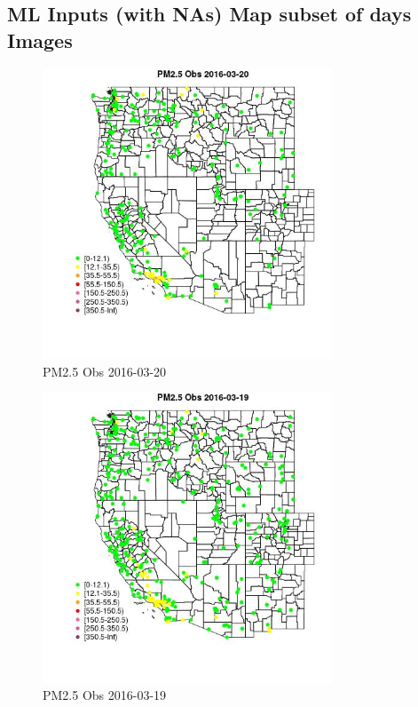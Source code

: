 
\subsection{ML Inputs (with NAs) Map subset of days Images} 
 

\begin{figure} 
\centering  
\includegraphics[width=0.77\textwidth]{Code_Outputs/Report_ML_input_PM25_Step4_part_e_de_duplicated_aveswNAs_MapObsPM25_Obs2016-03-20.jpg} 
\caption{\label{fig:Report_ML_input_PM25_Step4_part_e_de_duplicated_aveswNAsMapObsPM25_Obs2016-03-20}PM2.5 Obs 2016-03-20} 
\end{figure} 
 

\begin{figure} 
\centering  
\includegraphics[width=0.77\textwidth]{Code_Outputs/Report_ML_input_PM25_Step4_part_e_de_duplicated_aveswNAs_MapObsPM25_Obs2016-03-19.jpg} 
\caption{\label{fig:Report_ML_input_PM25_Step4_part_e_de_duplicated_aveswNAsMapObsPM25_Obs2016-03-19}PM2.5 Obs 2016-03-19} 
\end{figure} 
 

